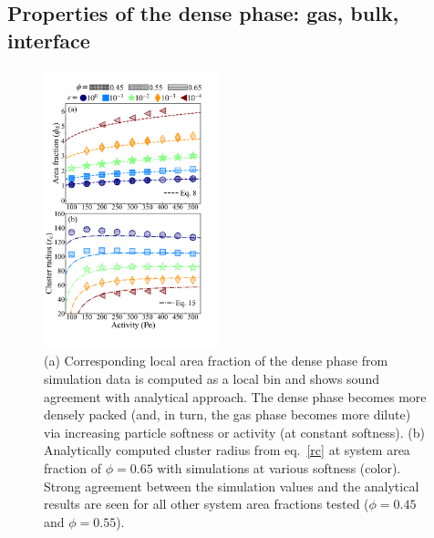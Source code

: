 \documentclass[twoside,twocolumn,9pt]{article}
\begin{document}
\subsection{Properties of the dense phase: gas, bulk, interface}\label{clustProps}

\begin{figure}%
\centering
  \includegraphics[width=0.45\textwidth, trim={0.2cm 2.7cm 2.3cm 2.0cm},clip]{figure_4.png}
  \caption{(a) Corresponding local area fraction of the dense phase from simulation data is computed as a local bin and shows sound agreement with analytical approach. The dense phase becomes more densely packed (and, in turn, the gas phase becomes more dilute) via increasing particle softness or activity (at constant softness). (b) Analytically computed cluster radius from eq.~\ref{rc} at system area fraction of $\phi=0.65$ with simulations at various softness (color). Strong agreement between the simulation values and the analytical results are seen for all other system area fractions tested ($\phi=0.45$ and $\phi=0.55$).}
  \label{phase}
\end{figure}
\end{document}
